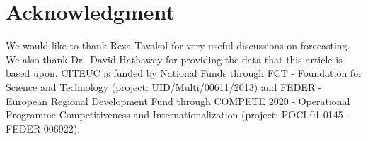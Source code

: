 \documentclass[journal]{IEEEtran}
\begin{document}


\section*{Acknowledgment}
We would like to thank Reza Tavakol for very useful discussions on forecasting. We also thank
Dr.\ David Hathaway for providing the data that this article is based upon. 
CITEUC is funded by National Funds through FCT - Foundation for Science
and Technology (project: UID/Multi/00611/2013) and FEDER - European
Regional Development Fund through
COMPETE 2020 - Operational Programme Competitiveness and
Internationalization (project: POCI-01-0145-FEDER-006922).

\ifCLASSOPTIONcaptionsoff
  \newpage
\fi




\end{document}
